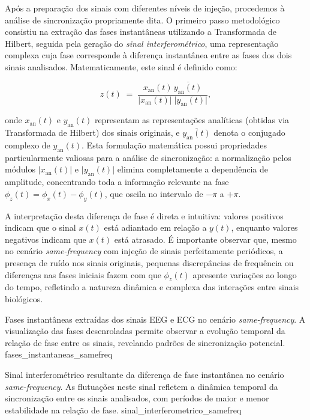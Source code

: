 Após a preparação dos sinais com diferentes níveis de injeção, procedemos à análise de sincronização propriamente dita. O primeiro passo metodológico consistiu na extração das fases instantâneas utilizando a Transformada de Hilbert, seguida pela geração do \textit{sinal interferométrico}, uma representação complexa cuja fase corresponde à diferença instantânea entre as fases dos dois sinais analisados. Matematicamente, este sinal é definido como:

\[
z(t) \;=\; \frac{x_{\mathrm{an}}(t)\,\overline{y_{\mathrm{an}}(t)}}{\bigl|x_{\mathrm{an}}(t)\bigr|\;\bigl|y_{\mathrm{an}}(t)\bigr|},
\]

onde \(x_{\mathrm{an}}(t)\) e \(y_{\mathrm{an}}(t)\) representam as representações analíticas (obtidas via Transformada de Hilbert) dos sinais originais, e \(\overline{y_{\mathrm{an}}(t)}\) denota o conjugado complexo de \(y_{\mathrm{an}}(t)\). Esta formulação matemática possui propriedades particularmente valiosas para a análise de sincronização: a normalização pelos módulos \(\bigl|x_{\mathrm{an}}(t)\bigr|\) e \(\bigl|y_{\mathrm{an}}(t)\bigr|\) elimina completamente a dependência de amplitude, concentrando toda a informação relevante na fase \(\phi_z(t) = \phi_x(t) - \phi_y(t)\), que oscila no intervalo de \(-\pi\) a \(+\pi\).

A interpretação desta diferença de fase é direta e intuitiva: valores positivos indicam que o sinal \(x(t)\) está adiantado em relação a \(y(t)\), enquanto valores negativos indicam que \(x(t)\) está atrasado. É importante observar que, mesmo no cenário \textit{same-frequency} com injeção de sinais perfeitamente periódicos, a presença de ruído nos sinais originais, pequenas discrepâncias de frequência ou diferenças nas fases iniciais fazem com que \(\phi_z(t)\) apresente variações ao longo do tempo, refletindo a natureza dinâmica e complexa das interações entre sinais biológicos.

\clearpage
{}
{Fases instantâneas extraídas dos sinais EEG e ECG no cenário \textit{same-frequency}. A visualização das fases desenroladas permite observar a evolução temporal da relação de fase entre os sinais, revelando padrões de sincronização potencial.}
{fases_instantaneas_samefreq}

{Sinal interferométrico resultante da diferença de fase instantânea no cenário \textit{same-frequency}. As flutuações neste sinal refletem a dinâmica temporal da sincronização entre os sinais analisados, com períodos de maior e menor estabilidade na relação de fase.}
{sinal_interferometrico_samefreq}

